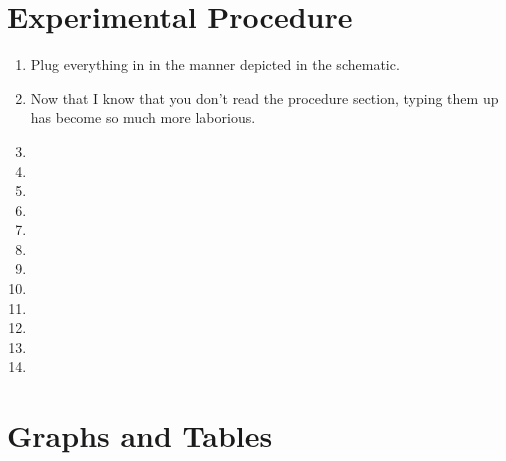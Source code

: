 \documentclass{amsart}
\begin{document}
\section{Experimental Procedure}
\begin{enumerate}
    \item Plug everything in in the manner depicted in the schematic.
    \item Now that I know that you don't read the procedure section, typing them up has become so much more laborious.
    \item
    \item
    \item
    \item
    \item
    \item
    \item
    \item
    \item
    \item
    \item
    \item
\end{enumerate}

\section{Graphs and Tables}
\end{document}
